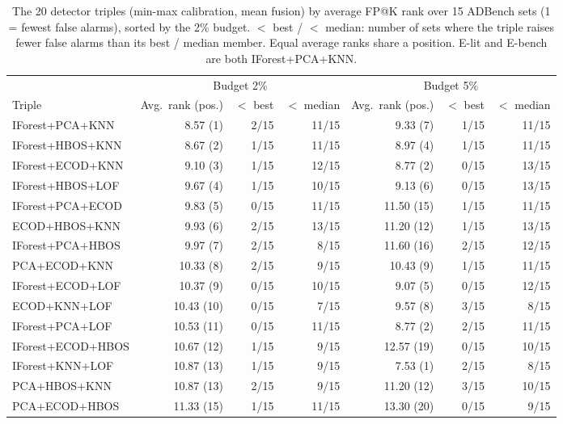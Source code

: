 \begin{table}[t]
\centering
\small
\setlength{\tabcolsep}{5pt}
\caption{The 20 detector triples (min-max calibration, mean fusion) by average FP@K rank over 15 ADBench sets (1 = fewest false alarms), sorted by the 2\% budget. $<$ best / $<$ median: number of sets where the triple raises fewer false alarms than its best / median member. Equal average ranks share a position. E-lit and E-bench are both IForest+PCA+KNN.}
\label{tab:e2-triples}
\begin{tabular}{lrrrrrr}
\toprule
 & \multicolumn{3}{c}{Budget 2\%} & \multicolumn{3}{c}{Budget 5\%} \\
\cmidrule(lr){2-4} \cmidrule(lr){5-7}
Triple & Avg.\ rank (pos.) & $<$ best & $<$ median & Avg.\ rank (pos.) & $<$ best & $<$ median \\
\midrule
IForest+PCA+KNN & 8.57 (1) & 2/15 & 11/15 & 9.33 (7) & 1/15 & 11/15 \\
IForest+HBOS+KNN & 8.67 (2) & 1/15 & 11/15 & 8.97 (4) & 1/15 & 11/15 \\
IForest+ECOD+KNN & 9.10 (3) & 1/15 & 12/15 & 8.77 (2) & 0/15 & 13/15 \\
IForest+HBOS+LOF & 9.67 (4) & 1/15 & 10/15 & 9.13 (6) & 0/15 & 13/15 \\
IForest+PCA+ECOD & 9.83 (5) & 0/15 & 11/15 & 11.50 (15) & 1/15 & 11/15 \\
ECOD+HBOS+KNN & 9.93 (6) & 2/15 & 13/15 & 11.20 (12) & 1/15 & 13/15 \\
IForest+PCA+HBOS & 9.97 (7) & 2/15 & 8/15 & 11.60 (16) & 2/15 & 12/15 \\
PCA+ECOD+KNN & 10.33 (8) & 2/15 & 9/15 & 10.43 (9) & 1/15 & 11/15 \\
IForest+ECOD+LOF & 10.37 (9) & 0/15 & 10/15 & 9.07 (5) & 0/15 & 12/15 \\
ECOD+KNN+LOF & 10.43 (10) & 0/15 & 7/15 & 9.57 (8) & 3/15 & 8/15 \\
IForest+PCA+LOF & 10.53 (11) & 0/15 & 11/15 & 8.77 (2) & 2/15 & 11/15 \\
IForest+ECOD+HBOS & 10.67 (12) & 1/15 & 9/15 & 12.57 (19) & 0/15 & 10/15 \\
IForest+KNN+LOF & 10.87 (13) & 1/15 & 9/15 & 7.53 (1) & 2/15 & 8/15 \\
PCA+HBOS+KNN & 10.87 (13) & 2/15 & 9/15 & 11.20 (12) & 3/15 & 10/15 \\
PCA+ECOD+HBOS & 11.33 (15) & 1/15 & 11/15 & 13.30 (20) & 0/15 & 9/15 \\

\end{tabular}
\end{table}
